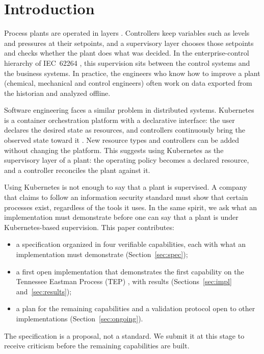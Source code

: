\documentclass[conference]{IEEEtran}
\begin{document}
\section{Introduction}

Process plants are operated in layers \cite{Skogestad2004}. Controllers keep variables such as levels and pressures at their setpoints, and a supervisory layer chooses those setpoints and checks whether the plant does what was decided. In the enterprise-control hierarchy of IEC~62264 \cite{IEC62264}, this supervision sits between the control systems and the business systems. In practice, the engineers who know how to improve a plant (chemical, mechanical and control engineers) often work on data exported from the historian and analyzed offline.

Software engineering faces a similar problem in distributed systems. Kubernetes is a container orchestration platform with a declarative interface: the user declares the desired state as resources, and controllers continuously bring the observed state toward it \cite{Burns2016}. New resource types and controllers can be added without changing the platform. This suggests using Kubernetes as the supervisory layer of a plant: the operating policy becomes a declared resource, and a controller reconciles the plant against it.

Using Kubernetes is not enough to say that a plant is supervised. A company that claims to follow an information security standard must show that certain processes exist, regardless of the tools it uses. In the same spirit, we ask what an implementation must demonstrate before one can say that a plant is under Kubernetes-based supervision. This paper contributes:
\begin{itemize}
\item a specification organized in four verifiable capabilities, each with what an implementation must demonstrate (Section~\ref{sec:spec});
\item a first open implementation that demonstrates the first capability on the Tennessee Eastman Process (TEP) \cite{DOWNS1993}, with results (Sections~\ref{sec:impl} and~\ref{sec:results});
\item a plan for the remaining capabilities and a validation protocol open to other implementations (Section~\ref{sec:ongoing}).
\end{itemize}
The specification is a proposal, not a standard. We submit it at this stage to receive criticism before the remaining capabilities are built.
\end{document}
